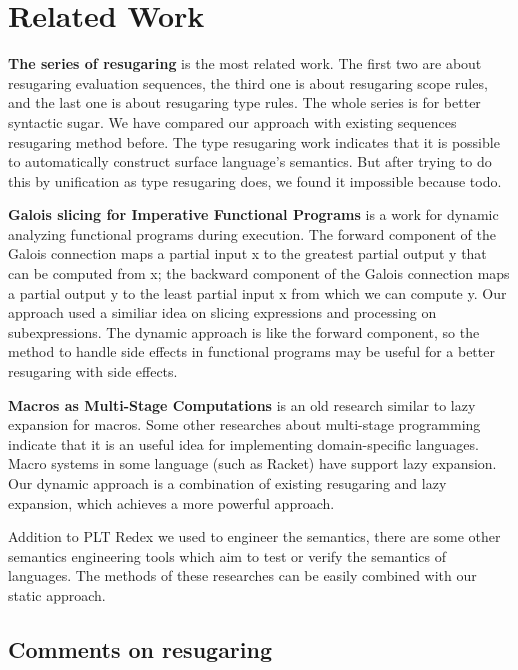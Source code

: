 \section{Related Work}
\label{sec5}

{\bfseries The series of resugaring\cite{resugaring,hygienic,resugaringtype,resugaringscope} }is the most related work. The first two are about resugaring evaluation sequences, the third one is about resugaring scope rules, and the last one is about resugaring type rules. The whole series is for better syntactic sugar. We have compared our approach with existing sequences resugaring method before. The type resugaring work indicates that it is possible to automatically construct surface language's semantics. But after trying to do this by unification as type resugaring does, we found it impossible because todo.


{\bfseries Galois slicing for Imperative Functional Programs\cite{slicing}} is a work for dynamic analyzing functional programs during execution. The forward component of the Galois connection maps a partial input x to the greatest partial output y that can be computed from x; the backward component of the Galois connection maps a partial output y to the least partial input x from which we can compute y. Our approach used a similiar idea on slicing expressions and processing on subexpressions. The dynamic approach is like the forward component, so the method to handle side effects in functional programs may be useful for a better resugaring with side effects.

{\bfseries Macros as Multi-Stage Computations\cite{multistage}} is an old research similar to lazy expansion for macros. Some other researches\cite{modularstaging} about multi-stage programming\cite{MSP} indicate that it is an useful idea for implementing domain-specific languages. Macro systems in some language (such as Racket\cite{racket}) have support lazy expansion. Our dynamic approach is a combination of existing resugaring and lazy expansion, which achieves a more powerful approach.

Addition to PLT Redex\cite{SEwPR} we used to engineer the semantics, there are some other semantics engineering tools\cite{dynsem,Ksemantic} which aim to test or verify the semantics of languages. The methods of these researches can be easily combined with our static approach.

\subsection{Comments on resugaring}

